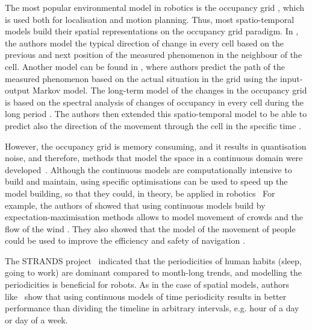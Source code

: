 The most popular environmental model in robotics is the occupancy grid \cite{elfes1989using}, which is used both for localisation and motion planning.
Thus, most spatio-temporal models build their spatial representations on the occupancy grid paradigm.
In \cite{kucner2013conditional}, the authors model the typical direction of change in every cell based on the previous and next position of the measured phenomenon in the neighbour of the cell. 
Another model can be found in \cite{wang2014modeling}, where authors predict the path of the measured phenomenon based on the actual situation in the grid using the input-output Markov model.
The long-term model of the changes in the occupancy grid is based on the spectral analysis of changes of occupancy in every cell during the long period \cite{krajnik2017fremen}.
The authors then extended this spatio-temporal model to be able to predict also the direction of the movement through the cell in the specific time \cite{molina2018modelling}.

However, the occupancy grid is memory consuming, and it results in quantisation noise, and therefore, methods that model the space in a continuous domain were developed~\cite{o2012gaussian}.
Although the continuous models are computationally intensive to build and maintain, using specific optimisations can be used to speed up the model building, so that they could, in theory, be applied in robotics~\cite{ramos2016hilbert}
For example, the authors of \cite{kucner2013conditional} showed that using continuous models build by expectation-maximisation methods allows to model movement of crowds and the flow of the wind \cite{kucner2017enabling}.
They also showed that the model of the movement of people could be used to improve the efficiency and safety of navigation \cite{palmieri2017kinodynamic}.

The STRANDS project~\cite{hawes2017strands} indicated that the periodicities of human habits (sleep, going to work) are dominant compared to month-long trends, and modelling the periodicities is beneficial for robots.
As in the case of spatial models, authors like~\cite{chinellato2017incremental} show that using continuous models of time periodicity results in better performance than dividing the timeline in arbitrary intervals, e.g. hour of a day or day of a week.

